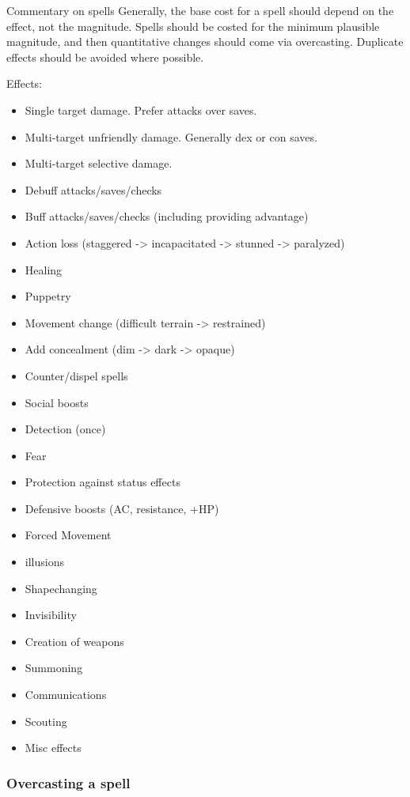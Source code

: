 \begin{DndComment}{Commentary on spells}
	Generally, the base cost for a spell should depend on the effect, not the magnitude. Spells should be costed for the minimum plausible magnitude, and then quantitative changes should come via overcasting. Duplicate effects should be avoided where possible.

	Effects:
	\begin{itemize}
		\item Single target damage. Prefer attacks over saves.
		\item Multi-target unfriendly damage. Generally dex or con saves.
		\item Multi-target selective damage.
		\item Debuff attacks/saves/checks
		\item Buff attacks/saves/checks (including providing advantage)
		\item Action loss (staggered -> incapacitated -> stunned -> paralyzed)
		\item Healing
		\item Puppetry
		\item Movement change (difficult terrain -> restrained)
		\item Add concealment (dim -> dark -> opaque)
		\item Counter/dispel spells
		\item Social boosts
		\item Detection (once)
		\item Fear
		\item Protection against status effects
		\item Defensive boosts (AC, resistance, +HP)
		\item Forced Movement
		\item illusions
		\item Shapechanging
		\item Invisibility
		\item Creation of weapons
		\item Summoning
		\item Communications
		\item Scouting
		\item Misc effects
	\end{itemize}
\end{DndComment}

\subsubsection{Overcasting a spell}


